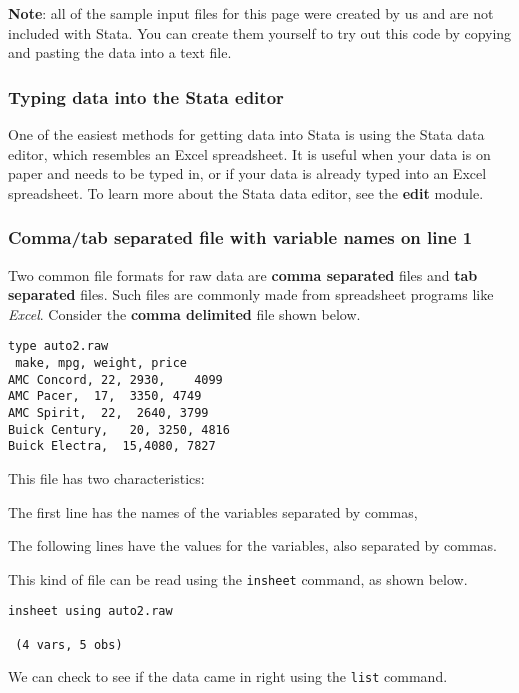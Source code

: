 \textbf{Note}: all of the sample input files for this page were created by us and are not included with Stata.  You can create them yourself to try out this code by copying and pasting the data into a text file.


\subsubsection{Typing data into the Stata editor}
One of the easiest methods for getting data into Stata is using the Stata data editor, which resembles an Excel spreadsheet. It is useful when your data is on paper and needs to be typed in, or if your data is already typed into an Excel spreadsheet. To learn more about the Stata data editor, see the \textbf{edit} module.

\subsubsection{Comma/tab separated file with variable names on line 1}
Two common file formats for raw data are \textbf{comma separated} files and \textbf{tab separated} files. Such files are commonly made from spreadsheet programs like \textit{Excel}. Consider the \textbf{comma delimited} file shown below.


\begin{lstlisting}
type auto2.raw
 make, mpg, weight, price
AMC Concord, 22, 2930,    4099
AMC Pacer,  17,  3350, 4749
AMC Spirit,  22,  2640, 3799
Buick Century,   20, 3250, 4816
Buick Electra,  15,4080, 7827
\end{lstlisting}

This file has two characteristics:
\begin{compactitem}
\item The first line has the names of the variables separated by commas,
\item The following lines have the values for the variables, also separated by commas.
\end{compactitem}

This kind of file can be read using the \lstinline{insheet} command, as shown below.

\begin{lstlisting}
insheet using auto2.raw

 (4 vars, 5 obs)
\end{lstlisting}

We can check to see if the data came in right using the \lstinline{list} command.

